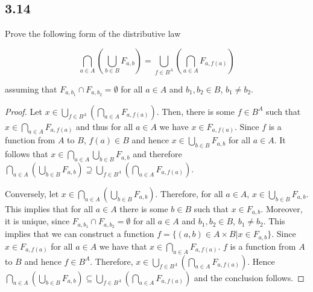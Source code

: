 \subsection*{3.14} Prove the following form of the distributive law

$$\bigcap_{a \in A}(\bigcup_{b\in B} F_{a,b}) = \bigcup_{f\in B^A}(\bigcap_{a \in A} F_{a,f(a)})$$

assuming that $F_{a,b_1} \cap F_{a,b_2} = \emptyset$ for all $a \in A$ and $b_1, b_2 \in B$, $b_1 \neq b_2$.

\begin{proof}
    Let $x \in \bigcup_{f\in B^A}(\bigcap_{a \in A} F_{a,f(a)})$. Then, there is some $f \in B^A$ such that $x \in \bigcap_{a \in A} F_{a,f(a)}$ and thus for all $a \in A$ we have $x \in F_{a, f(a)}$. Since $f$ is a function from $A$ to $B$, $f(a) \in B$ and hence $x \in \bigcup_{b \in B} F_{a, b}$ for all $a \in A$. It follows that $x \in \bigcap_{a \in A}  \bigcup_{b \in B} F_{a, b}$ and therefore $\bigcap_{a \in A}(\bigcup_{b\in B} F_{a,b}) \supseteq \bigcup_{f\in B^A}(\bigcap_{a \in A} F_{a,f(a)})$.
    
    Conversely, let $x \in \bigcap_{a \in A}(\bigcup_{b\in B} F_{a,b})$. Therefore, for all $a \in A$, $x \in \bigcup_{b \in B} F_{a,b}$. This implies that for all $a \in A$ there is some $b \in B$ such that $x \in F_{a,b}$. Moreover, it is unique, since $F_{a,b_1} \cap F_{a,b_2} = \emptyset$ for all $a \in A$ and $b_1, b_2 \in B$, $b_1 \neq b_2$. This implies that we can construct a function $f = \{(a,b) \in A \times B | x \in F_{a,b}\}$. Since $x \in F_{a, f(a)}$ for all $a \in A$ we have that $x \in \bigcap_{a \in A} F_{a, f(a)}$. $f$ is a function from $A$ to $B$ and hence $f \in B^A$. Therefore, $x \in \bigcup_{f\in B^A}(\bigcap_{a \in A} F_{a,f(a)})$. Hence $\bigcap_{a \in A}(\bigcup_{b\in B} F_{a,b}) \subseteq \bigcup_{f\in B^A}(\bigcap_{a \in A} F_{a,f(a)})$ and the conclusion follows.
\end{proof}

